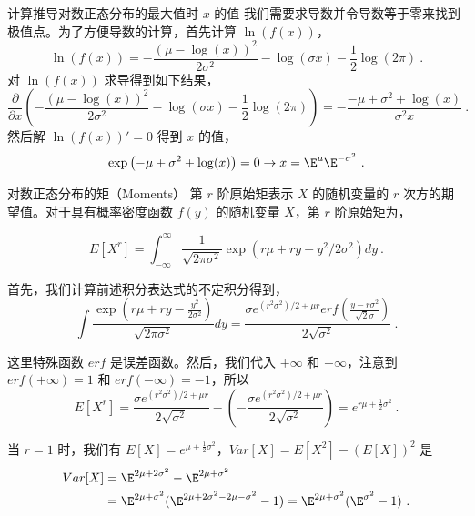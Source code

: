 \begin{example}{计算推导对数正态分布的最大值时 \( x \) 的值}
我们需要求导数并令导数等于零来找到极值点。为了方便导数的计算，首先计算 $\ln(f(x))$，
\begin{equation}
    \ln(f(x)) = -\frac{(\mu-\log (x))^2}{2 \sigma^2}-\log (\sigma x)-\frac{1}{2} \log (2 \pi)~.
\end{equation}
对 $\ln(f(x))$ 求导得到如下结果，
\begin{equation}
\frac{\partial}{\partial x}\left(-\frac{(\mu-\log (x))^2}{2 \sigma^2}-\log (\sigma x)-\frac{1}{2} \log (2 \pi)\right) = -\frac{-\mu+\sigma^2+\log (x)}{\sigma^2 x}~.
\end{equation}
然后解 $\ln(f(x))'=0$ 得到 $x$ 的值，
\begin{equation}
    \exp \left({-\mu+\sigma^2+\log (x)}\right) = 0 \rightarrow x = \E^{\mu}\E^{-\sigma^2}~.
\end{equation}
\end{example}
\begin{example}{对数正态分布的矩（Moments）}
第 $r$ 阶原始矩表示 $X$ 的随机变量的 $r$ 次方的期望值。对于具有概率密度函数 $f(y)$ 的随机变量 $X$，第 $r$ 阶原始矩为，

\begin{equation}
E\left[X^r\right]=\int_{-\infty}^{\infty} \frac{1}{\sqrt{2 \pi \sigma^2}} \exp \left(r \mu+r y-y^2 / 2 \sigma^2\right)dy ~.
\end{equation}

首先，我们计算前述积分表达式的不定积分得到，
\begin{equation}
\int \frac{\exp \left(r \mu+r y-\frac{y^2}{2 \sigma^2}\right)}{\sqrt{2 \pi \sigma^2}} d y=\frac{\sigma e^{\left(r^2 \sigma^2\right) / 2+\mu r} erf\left(\frac{y-r \sigma^2}{\sqrt{2} \sigma}\right)}{2 \sqrt{\sigma^2}}~.
\end{equation}

这里特殊函数 $erf$ 是误差函数。然后，我们代入 $+\infty$ 和 $-\infty$，注意到 $erf(+\infty)=1$ 和 $erf(-\infty)=-1$，所以
\begin{equation}
E\left[X^r\right]=\frac{\sigma e^{\left(r^2 \sigma^2\right) / 2+\mu r}}{2 \sqrt{\sigma^2}}-\left(-\frac{\sigma e^{\left(r^2 \sigma^2\right) / 2+\mu r}}{2 \sqrt{\sigma^2}}\right) = e^{r\mu+\frac{1}{2}\sigma^2}~.
\end{equation}

当 $r=1$ 时，我们有 $E\left[X\right]=e^{\mu+\frac{1}{2}\sigma^2}$，$Var[X] = E\left[X^2\right] - \left(E\left[X\right]\right)^2$ 是
\begin{align}
Var[X] &= \E^{2\mu+2\sigma^2} - \E^{2\mu+\sigma^2} \\
&= \E^{2\mu+\sigma^2}(\E^{2\mu+2\sigma^2-2\mu-\sigma^2}- 1) = \E^{2\mu+\sigma^2}(\E^{\sigma^2}- 1)~.
\end{align}
\end{example}